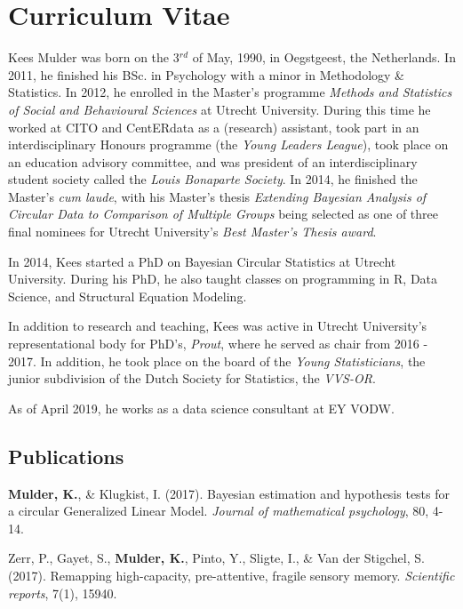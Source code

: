 \documentclass[12pt, a4paper]{book}\usepackage[]{graphicx}\usepackage{xcolor}
\begin{document}
\chapter{Curriculum Vitae}

Kees Mulder was born on the 3$^{rd}$ of May, 1990, in Oegstgeest, the Netherlands. In 2011, he finished his BSc. in Psychology with a minor in Methodology \& Statistics. In 2012, he enrolled in the Master's programme \textit{Methods and Statistics of Social and Behavioural Sciences} at Utrecht University. During this time he worked at CITO and CentERdata as a (research) assistant, took part in an interdisciplinary Honours programme (the \textit{Young Leaders League}), took place on an education advisory committee, and was president of an interdisciplinary student society called the \textit{Louis Bonaparte Society}. In 2014, he finished the Master's \textit{cum laude}, with his Master's thesis \textit{Extending Bayesian Analysis of Circular Data to Comparison of Multiple Groups} being selected as one of three final nominees for Utrecht University's \textit{Best Master's Thesis award}.

In 2014, Kees started a PhD on Bayesian Circular Statistics at Utrecht University. During his PhD, he also taught classes on programming in R, Data Science, and Structural Equation Modeling.

In addition to research and teaching, Kees was active in Utrecht University's representational body for PhD's, \textit{Prout}, where he served as chair from 2016 - 2017. In addition, he took place on the board of the \textit{Young Statisticians}, the junior subdivision of the Dutch Society for Statistics, the \textit{VVS-OR}.

As of April 2019, he works as a data science consultant at EY VODW.


\newpage

\section*{Publications}


\noindent \textbf{Mulder, K.}, \& Klugkist, I. (2017). Bayesian estimation and hypothesis tests for a circular Generalized Linear Model. \textit{Journal of mathematical psychology}, 80, 4-14.

\vspace{.3cm}

\noindent Zerr, P., Gayet, S., \textbf{Mulder, K.}, Pinto, Y., Sligte, I., \& Van der Stigchel, S. (2017). Remapping high-capacity, pre-attentive, fragile sensory memory. \textit{Scientific reports}, 7(1), 15940.
\end{document}

